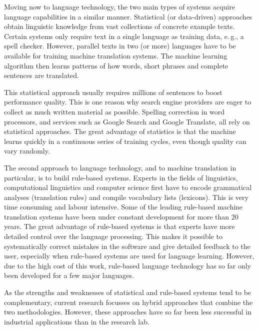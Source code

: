 \begin{multicols}{2}

Moving now to language technology, the two main types of systems acquire language capabilities in a similar manner. Statistical (or data-driven) approaches obtain linguistic knowledge from vast collections of concrete example texts. Certain systems only require text in a single language as training data, e.\,g., a spell checker. However, parallel texts in two (or more) languages have to be available for training machine translation systems. The machine learning algorithm then learns patterns of how words, short phrases and complete sentences are translated. 

This statistical approach usually requires millions of sentences to boost performance quality. This is one reason why search engine providers are eager to collect as much written material as possible. Spelling correction in word processors, and services such as Google Search and Google Translate, all rely on statistical approaches. The great advantage of statistics is that the machine learns quickly in a continuous series of training cycles, even though quality can vary randomly.

The second approach to language technology, and to machine translation in particular, is to build rule-based systems. Experts in the fields of linguistics, computational linguistics and computer science first have to encode grammatical analyses (translation rules) and compile vocabulary lists (lexicons). This is very time consuming and labour intensive. Some of the leading rule-based machine translation systems have been under constant development for more than 20 years. The great advantage of rule-based systems is that experts have more detailed control over the language processing. This makes it possible to systematically correct mistakes in the software and give detailed feedback to the user, especially when rule-based systems are used for language learning. However, due to the high cost of this work, rule-based language technology has so far only been developed for a few major languages.


As the strengths and weaknesses of statistical and rule-based systems tend to be complementary, current research focusses on hybrid approaches that combine the two methodologies. However, these approaches have so far been less successful in industrial applications than in the research lab. 


\end{multicols}
